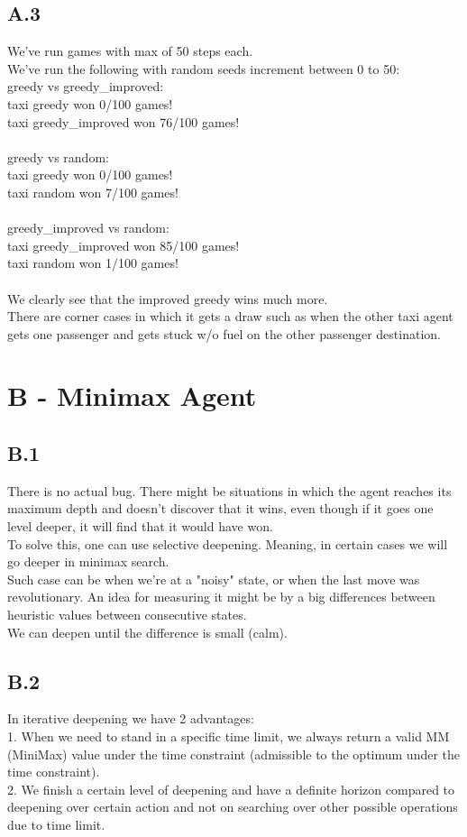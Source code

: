 \documentclass[12pt]{article}
\begin{document}
\subsection*{A.3}
We've run games with max of 50 steps each.\\
We've run the following with random seeds increment between 0 to 50:\\
greedy vs greedy\_improved:\\
taxi greedy won 0/100 games!\\
taxi greedy\_improved won 76/100 games!\\
\\
greedy vs random:\\
taxi greedy won 0/100 games!\\
taxi random won 7/100 games!\\
\\
greedy\_improved vs random:\\
taxi greedy\_improved won 85/100 games!\\
taxi random won 1/100 games!\\
\\
We clearly see that the improved greedy wins much more.\\
There are corner cases in which it gets a draw such as when the other taxi agent gets one passenger and gets stuck w/o fuel on the other passenger destination.

\section*{B - Minimax Agent}

\subsection*{B.1}
There is no actual bug. There might be situations in which the agent reaches its maximum depth and doesn't discover that it wins, even though if it goes one level deeper, it will find that it would have won.\\
To solve this, one can use selective deepening. Meaning, in certain cases we will go deeper in minimax search.\\
Such case can be when we're at a "noisy" state, or when the last move was revolutionary. An idea for measuring it might be by a big differences between heuristic values between consecutive states.\\
We can deepen until the difference is small (calm).

\subsection*{B.2}
In iterative deepening we have 2 advantages:\\
1. When we need to stand in a specific time limit, we always return a valid MM (MiniMax) value under the time constraint (admissible to the optimum under the time constraint).\\
2. We finish a certain level of deepening and have a definite horizon compared to deepening over certain action and not on searching over other possible operations due to time limit. 
\end{document}
